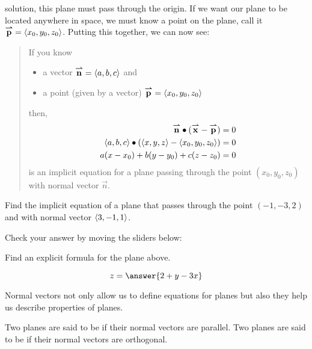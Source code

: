 \documentclass{ximera}
\begin{document}
solution, this plane must pass through the origin. If we want our
plane to be located anywhere in space, we must know a point on the
plane, call it ${\overset{\boldsymbol{\rightharpoonup}}{\mathbf{p}}}=\left\langle x_0,y_0,z_0\right\rangle$. Putting this together, we can
now see:
\begin{quote}
  If you know
\begin{itemize}
  \item a vector ${\overset{\boldsymbol{\rightharpoonup}}{\mathbf{n}}} = \left\langle a,b,c\right\rangle$ and
  \item a point (given by a vector) ${\overset{\boldsymbol{\rightharpoonup}}{\mathbf{p}}} = \left\langle x_0,y_0,z_0\right\rangle$
\end{itemize}
then,
\begin{align*}
  {\overset{\boldsymbol{\rightharpoonup}}{\mathbf{n}}}\bullet({\overset{\boldsymbol{\rightharpoonup}}{\mathbf{x}}}-{\overset{\boldsymbol{\rightharpoonup}}{\mathbf{p}}}) &= 0\\
  \left\langle a,b,c\right\rangle\bullet(\left\langle x,y,z\right\rangle-\left\langle x_0,y_0,z_0\right\rangle)&=0\\
  a(x-x_0) + b(y-y_0) + c(z-z_0) &= 0
\end{align*}
is an implicit equation for a plane passing through the point
$(x_0,y_0,z_0)$ with normal vector $\vec{n}$.
\end{quote}

\begin{question}
  Find the implicit equation of a plane that passes through the point
  $(-1,-3,2)$ and with normal vector $\left\langle 3,-1,1\right\rangle$.
\begin{onlineOnly}
  Check your answer by moving the sliders below:
  \begin{center}
  \end{center}
\end{onlineOnly}
\begin{question}
  Find an explicit formula for the plane above.
  \begin{prompt}
    \[
    z = \answer{2+y-3x}
    \]
  \end{prompt}
\end{question}
\end{question}

Normal vectors not only allow us to define equations for planes but also 
they help us describe properties of planes.

\begin{definition}
  Two planes are said to be  if their normal vectors are
  parallel. Two planes are said to be  if their normal
  vectors are orthogonal.
\end{definition}
\end{document}
